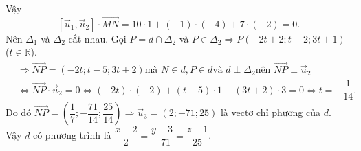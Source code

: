 \begin{ex}
{\begin{itemchoice}
			 Vậy
			$$\left[\overrightarrow{u}_{1},\overrightarrow{u}_{2}\right]\cdot\overrightarrow{MN}=10\cdot1+(-1)\cdot(-4)+7\cdot(-2)=0.$$ 
			Nên $\Delta_{1}$ và $\Delta_{2}$  cắt nhau.
			\itemch Gọi $P=d \cap \Delta_2$ và $P \in \Delta_2 \Rightarrow P(-2  t+2; t-2; 3 t+1)$ ($t \in \mathbb{R}$).
			\begin{equation*}
				\begin{aligned}
					& \Rightarrow \overrightarrow{N P}=(-2 t; t-5; 3 t+2) \text {mà } N \in d, P \in d \text {và } d \perp \Delta_2 \text {nên } \overrightarrow{N P} \perp \overrightarrow{u}_{2} \\ 
					& \Leftrightarrow \overrightarrow{N P} \cdot \overrightarrow{u}_{2}=0 \Leftrightarrow(-2 t) \cdot(-2)+(t-5) \cdot 1+(3  t+2) \cdot 3=0 \Leftrightarrow t=-\dfrac{1}{14}.
				\end{aligned}
			\end{equation*}
			 Do đó $\overrightarrow{N P}=\left(\dfrac{1}{7};-\dfrac{71}{14}; \dfrac{25}{14}\right) \Rightarrow \overrightarrow{u}_{3}=(2;-71; 25)$ là vectơ chỉ phương của $d$.\\
			Vậy $d$ có phương  trình là $\dfrac{x-2}{2}=\dfrac{y-3}{-71}=\dfrac{z+1}{25}$.
		\end{itemchoice}
	 }
\end{ex}

